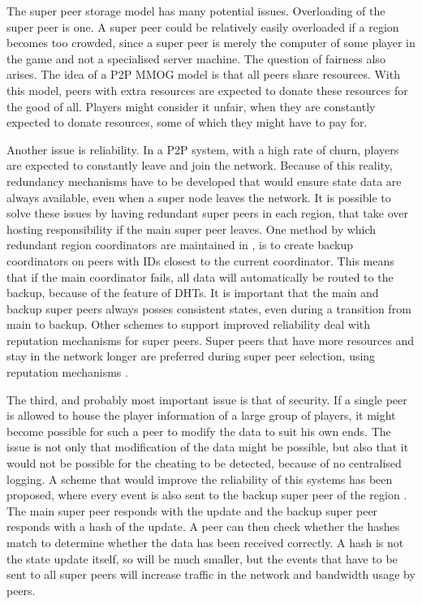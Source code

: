 \documentclass[journal,oneside,a4paper,onecolumn]{IEEEtran}
\begin{document}
The super peer storage model has many potential issues. Overloading of the super peer is one. A super peer could be relatively easily overloaded if a region becomes too crowded, since a super peer is merely the computer of some player in the game and not a specialised server machine. The question of fairness also arises. The idea of a P2P MMOG model is that all peers share resources. With this model, peers with extra resources are expected to donate these resources for the good of all. Players might consider it unfair, when they are constantly expected to donate resources, some of which they might have to pay for.

Another issue is reliability. In a P2P system, with a high rate of churn, players are expected to constantly leave and join the network. Because of this reality, redundancy mechanisms have to be developed that would ensure state data are always available, even when a super node leaves the network. It is possible to solve these issues by having redundant super peers in each region, that take over hosting responsibility if the main super peer leaves. One method by which redundant region coordinators are maintained in \cite{knutsson_p2p_first}, is to create backup coordinators on peers with IDs closest to the current coordinator. This means that if the main coordinator fails, all data will automatically be routed to the backup, because of the feature of DHTs. It is important that the main and backup super peers always posses consistent states, even during a transition from main to backup. Other schemes to support improved reliability deal with reputation mechanisms for super peers. Super peers that have more resources and stay in the network longer are preferred during super peer selection, using reputation mechanisms \cite{fan_mediator_paper}.

The third, and probably most important issue is that of security. If a single peer is allowed to house the player information of a large group of players, it might become possible for such a peer to modify the data to suit his own ends. The issue is not only that modification of the data might be possible, but also that it would not be possible for the cheating to be detected, because of no centralised logging. A scheme that would improve the reliability of this systems has been proposed, where every event is also sent to the backup super peer of the region \cite{past_storage_focus}. The main super peer responds with the update and the backup super peer responds with a hash of the update. A peer can then check whether the hashes match to determine whether the data has been received correctly. A hash is not the state update itself, so will be much smaller, but the events that have to be sent to all super peers will increase traffic in the network and bandwidth usage by peers.
\end{document}
